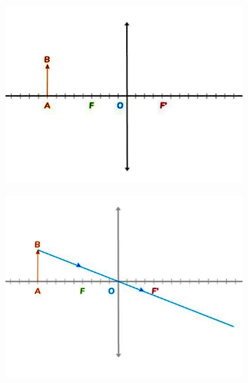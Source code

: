 \documentclass[11pt,a4paper]{article}
\begin{document}
\begin{figure}[ht]
\centering
\begin{subfigure}{.18\textwidth}
  \centering
  \includegraphics[width=.95\linewidth]{imgs/p6/construct1.jpg}  
\end{subfigure}
\begin{subfigure}{.18\textwidth}
  \centering
  \includegraphics[width=.95\linewidth]{imgs/p6/constrcut2.jpg}  
\end{subfigure}
\begin{subfigure}{.18\textwidth}
  \centering

\end{subfigure}
\end{figure}
\end{document}
